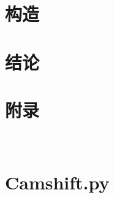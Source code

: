 \documentclass{article}
\begin{document}




\newpage
\section{构造}

\section{结论}

\section{附录}
\newpage
\appendix
\section{\\Camshift.py} \label{App:AppendixA}
\end{document}
